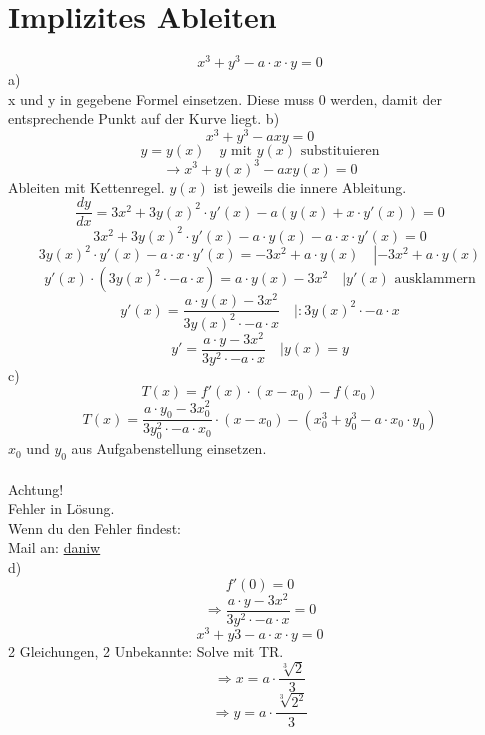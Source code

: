 \section{Implizites Ableiten}
\[ x^3 + y^3 - a \cdot x \cdot y = 0 \]
a)\\
x und y in gegebene Formel einsetzen. Diese muss 0 werden, damit der entsprechende Punkt auf der Kurve liegt. 
b)\\
\[ x^3 + y^3 - a x y = 0 \]
\[ y = y(x) \quad \text{$y$ mit $y(x)$ substituieren} \]
\[ \rightarrow x^3 + y(x)^3 - a x y(x) = 0 \]
Ableiten mit Kettenregel. $y(x)$ ist jeweils die innere Ableitung. 
\[ \frac{dy}{dx} = 3x^2 + 3y(x)^2 \cdot y'(x) - a\left(y(x) + x \cdot y'(x)\right) = 0 \]
\[ 3x^2 + 3y(x)^2 \cdot y'(x) - a \cdot y(x) - a \cdot x \cdot y'(x) = 0 \]
\[ 3y(x)^2 \cdot y'(x) - a \cdot x \cdot y'(x) = - 3x^2 + a \cdot y(x) \quad \left|- 3x^2 + a \cdot y(x)\right.\]
\[ y'(x) \cdot \left(3y(x)^2 \cdot - a \cdot x \right) = a \cdot y(x) - 3x^2 \quad |y'(x)\text{ ausklammern}\]
\[ y'(x) = \frac{a \cdot y(x) - 3x^2}{3y(x)^2 \cdot - a \cdot x} \quad |:3y(x)^2 \cdot - a \cdot x \]
\[ y' = \frac{a \cdot y - 3x^2}{3y^2 \cdot - a \cdot x} \quad |y(x) = y \]
c)\\
\[ T(x) = f'(x) \cdot (x - x_0) - f(x_0) \]
\[ T(x) =  \frac{a \cdot y_0 - 3x_0^2}{3y_0^2 \cdot - a \cdot x_0} \cdot (x - x_0) - (x_0^3 + y_0^3 - a \cdot x_0 \cdot y_0) \]
$x_0$ und $y_0$ aus Aufgabenstellung einsetzen. \\\\
{\Huge Achtung! \\Fehler in Lösung. \\Wenn du den Fehler findest: \\Mail an: \href{mailto:daniel.winz@stud.hslu.ch}{daniw}}\\
d)\\
\[ f'(0) = 0 \]
\[ \Rightarrow  \frac{a \cdot y - 3x^2}{3y^2 \cdot - a \cdot x} = 0 \]
\[ x^3 + y3 - a \cdot x \cdot y = 0 \]
2 Gleichungen, 2 Unbekannte: Solve mit TR. \\
\[ \Rightarrow x = a \cdot \frac{\sqrt[3]{2}}{3}\]
\[ \Rightarrow y = a \cdot \frac{\sqrt[3]{2^2}}{3}\]